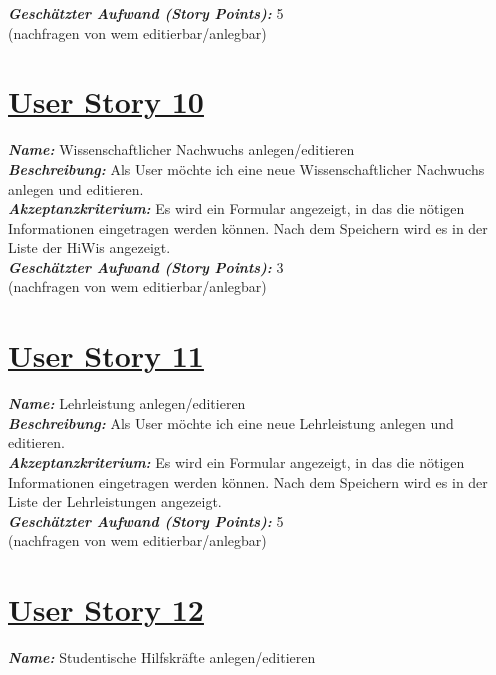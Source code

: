 \documentclass[12pt]{article}%
\begin{document}
\textbf{\textit{Geschätzter Aufwand (Story Points):}} 5
\\


(nachfragen von wem editierbar/anlegbar)
\section*{\large \underline{User Story 10}}
\textit{\textbf{Name:}} Wissenschaftlicher Nachwuchs anlegen/editieren
\\

\textbf{\textit{Beschreibung:}} Als User möchte ich eine neue Wissenschaftlicher Nachwuchs anlegen und editieren.
\\

\textbf{\textit{Akzeptanzkriterium:}} Es wird ein Formular angezeigt, in das die nötigen Informationen eingetragen werden können. Nach dem Speichern wird es in der Liste der HiWis angezeigt.
\\

\textbf{\textit{Geschätzter Aufwand (Story Points):}} 3
\\


(nachfragen von wem editierbar/anlegbar)
\section*{\large \underline{User Story 11}}
\textit{\textbf{Name:}} Lehrleistung anlegen/editieren
\\

\textbf{\textit{Beschreibung:}} Als User möchte ich eine neue Lehrleistung anlegen und editieren.
\\

\textbf{\textit{Akzeptanzkriterium:}} Es wird ein Formular angezeigt, in das die nötigen Informationen eingetragen werden können. Nach dem Speichern wird es in der Liste der Lehrleistungen angezeigt.
\\

\textbf{\textit{Geschätzter Aufwand (Story Points):}} 5
\\


(nachfragen von wem editierbar/anlegbar)
\section*{\large \underline{User Story 12}}
\textit{\textbf{Name:}} Studentische Hilfskräfte anlegen/editieren
\\
\end{document}
